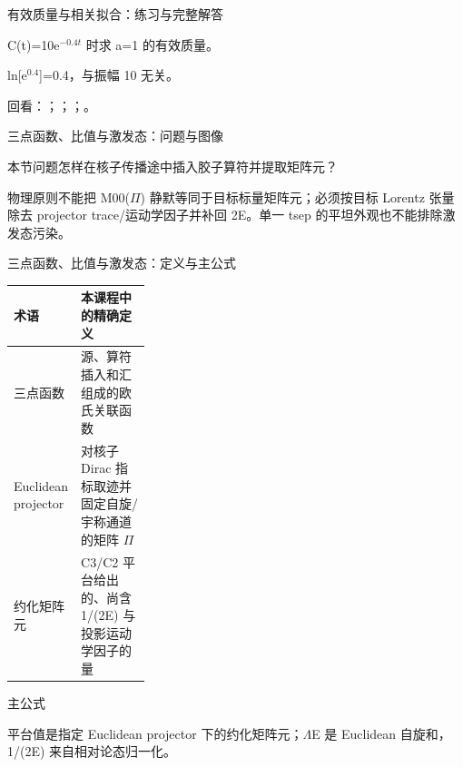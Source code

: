 \begin{frame}[t]{有效质量与相关拟合：练习与完整解答}
\footnotesize
\begin{block}{}C(t)=10e\ensuremath{^{-0.4t}} 时求 a=1 的有效质量。\end{block}
\begin{exampleblock}{}ln[e\ensuremath{^{0.4}}]=0.4，与振幅 10 无关。\end{exampleblock}
\vfill
\scriptsize 回看：；；；。
\end{frame}

\begin{frame}[t]{三点函数、比值与激发态：问题与图像}
\footnotesize
\begin{block}{本节问题}怎样在核子传播途中插入胶子算符并提取矩阵元？\end{block}
\begin{block}{物理原则}\quad 不能把 M00(\ensuremath{\Pi}) 静默等同于目标标量矩阵元；必须按目标 Lorentz 张量除去 projector trace/\allowbreak{}运动学因子并补回 2E。单一 tsep 的平坦外观也不能排除激发态污染。\end{block}
\end{frame}

\begin{frame}[t]{三点函数、比值与激发态：定义与主公式}
\footnotesize\begin{tabularx}{\linewidth}{p{0.30\linewidth}Y}
\toprule 术语 & 本课程中的精确定义\\\midrule
{} 三点函数 & 源、算符插入和汇组成的欧氏关联函数\\
 Euclidean projector & 对核子 Dirac 指标取迹并固定自旋/\allowbreak{}宇称通道的矩阵 \ensuremath{\Pi}\\
 约化矩阵元 & C3/\allowbreak{}C2 平台给出的、尚含 1/\allowbreak{}(2E) 与投影运动学因子的量\\
\bottomrule\end{tabularx}\vspace{0.15cm}
\begin{block}{ 主公式}\centering{}\end{block}
平台值是指定 Euclidean projector 下的约化矩阵元；\ensuremath{\Lambda}E 是 Euclidean 自旋和，1/\allowbreak{}(2E) 来自相对论态归一化。
\end{frame}

